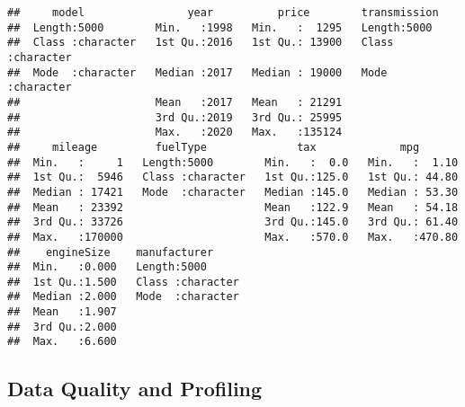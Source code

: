 \documentclass[
]{article}
\newenvironment{Shaded}{\begin{snugshade}}{\end{snugshade}}
\newcommand{\AttributeTok}[1]{\textcolor[rgb]{0.77,0.63,0.00}{#1}}
\newcommand{\DecValTok}[1]{\textcolor[rgb]{0.00,0.00,0.81}{#1}}
\newcommand{\FloatTok}[1]{\textcolor[rgb]{0.00,0.00,0.81}{#1}}
\newcommand{\FunctionTok}[1]{\textcolor[rgb]{0.00,0.00,0.00}{#1}}
\newcommand{\NormalTok}[1]{#1}
\newcommand{\OtherTok}[1]{\textcolor[rgb]{0.56,0.35,0.01}{#1}}
\newcommand{\SpecialCharTok}[1]{\textcolor[rgb]{0.00,0.00,0.00}{#1}}
\newcommand{\StringTok}[1]{\textcolor[rgb]{0.31,0.60,0.02}{#1}}
\begin{document}
\begin{verbatim}
##     model                year          price        transmission      
##  Length:5000        Min.   :1998   Min.   :  1295   Length:5000       
##  Class :character   1st Qu.:2016   1st Qu.: 13900   Class :character  
##  Mode  :character   Median :2017   Median : 19000   Mode  :character  
##                     Mean   :2017   Mean   : 21291                     
##                     3rd Qu.:2019   3rd Qu.: 25995                     
##                     Max.   :2020   Max.   :135124                     
##     mileage         fuelType              tax             mpg        
##  Min.   :     1   Length:5000        Min.   :  0.0   Min.   :  1.10  
##  1st Qu.:  5946   Class :character   1st Qu.:125.0   1st Qu.: 44.80  
##  Median : 17421   Mode  :character   Median :145.0   Median : 53.30  
##  Mean   : 23392                      Mean   :122.9   Mean   : 54.18  
##  3rd Qu.: 33726                      3rd Qu.:145.0   3rd Qu.: 61.40  
##  Max.   :170000                      Max.   :570.0   Max.   :470.80  
##    engineSize    manufacturer      
##  Min.   :0.000   Length:5000       
##  1st Qu.:1.500   Class :character  
##  Median :2.000   Mode  :character  
##  Mean   :1.907                     
##  3rd Qu.:2.000                     
##  Max.   :6.600
\end{verbatim}

\newpage

\hypertarget{data-quality-and-profiling}{%
\subsection{Data Quality and
Profiling}\label{data-quality-and-profiling}}

\begin{Shaded}
\end{Shaded}
\end{document}
